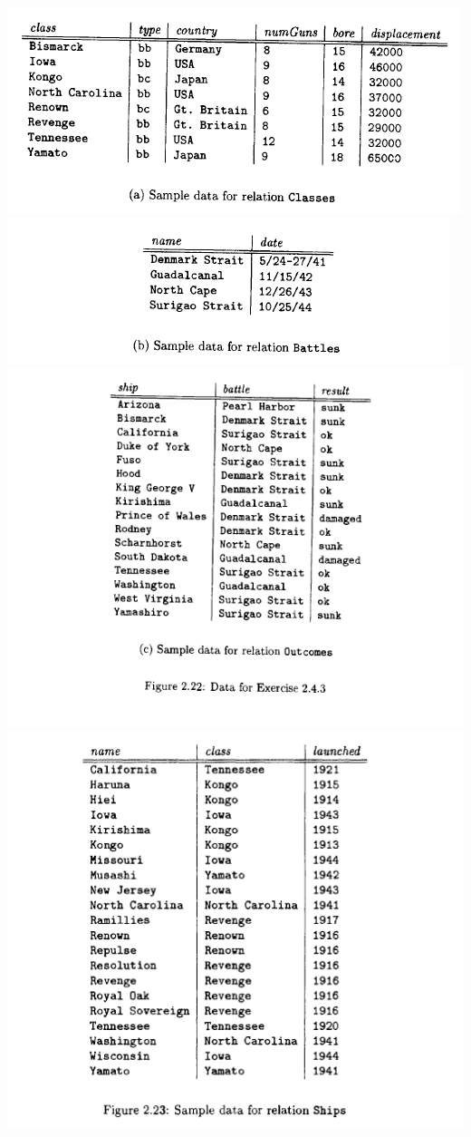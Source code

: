 \documentclass[12pt]{article}
\begin{document}
\begin{enumerate}[1.]
    \begin{center}
    \includegraphics[width=0.75\linewidth]{images/worksheet_2_1.png}
    \includegraphics[width=0.75\linewidth]{images/worksheet_2_2.png}
    \includegraphics[width=0.75\linewidth]{images/worksheet_2_3.png}
    \includegraphics[width=0.75\linewidth]{images/worksheet_2_4.png}
    \end{center}


\end{enumerate}
\end{document}

